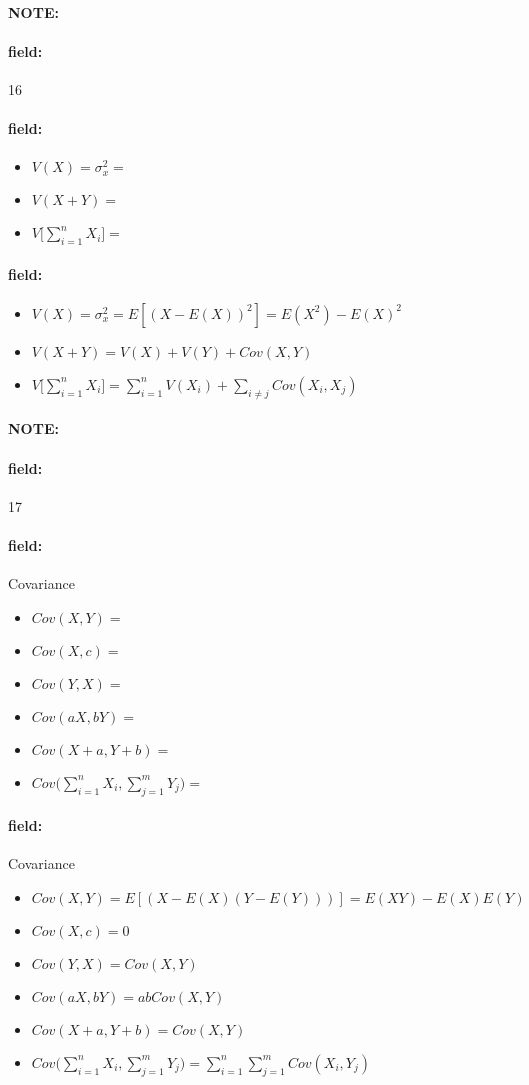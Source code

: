 \documentclass[12pt]{article}
\newenvironment{note}{\paragraph{NOTE:}}{}
\newenvironment{field}{\paragraph{field:}}{}
\begin{document}
\begin{note}
  \begin{field}
    \tiny 16
  \end{field}
  \begin{field}
    \begin{itemize}
      \item $V(X) = \sigma_x^2 = $
      \item $V(X+Y) =$
      \item $V\bigg[\sum_{i=1}^n X_i\bigg] = $
    \end{itemize}
  \end{field}
  \begin{field}
    \begin{itemize}
      \item $V(X) = \sigma_x^2 = E[(X - E(X))^2] = E(X^2) - E(X)^2$
      \item $V(X+Y) = V(X) + V(Y) + Cov(X,Y)$
      \item $V\bigg[\sum_{i=1}^n X_i\bigg] = \sum_{i=1}^n V(X_i) + \sum_{i\neq j} Cov(X_i,X_j)$
    \end{itemize}
  \end{field}
\end{note}








\begin{note}
  \begin{field}
    \tiny 17
  \end{field}
  \begin{field}
    Covariance
    \begin{itemize}
      \item $Cov(X,Y) = $
      \item $Cov(X,c) = $
      \item $Cov(Y,X) = $
      \item $Cov(aX,bY) =$
      \item $Cov(X + a, Y + b) =$
      \item $Cov\bigg(\sum_{i=1}^n X_i, \sum_{j=1}^m Y_j\bigg) = $
    \end{itemize}
  \end{field}
  \begin{field}
    Covariance
    \begin{itemize}
      \item $Cov(X,Y) = E[(X - E(X)(Y - E(Y)))] = E(XY) - E(X)E(Y)$
      \item $Cov(X,c) = 0$
      \item $Cov(Y,X) = Cov(X,Y)$
      \item $Cov(aX,bY) = abCov(X,Y)$
      \item $Cov(X + a, Y + b) = Cov(X,Y)$
      \item $Cov\bigg(\sum_{i=1}^n X_i, \sum_{j=1}^m Y_j\bigg) = \sum_{i=1}^n \sum_{j=1}^m Cov(X_i,Y_j)$
    \end{itemize}
  \end{field}
\end{note}
\end{document}
